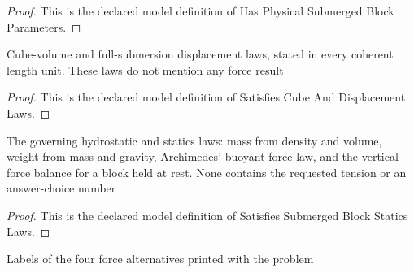 \begin{proof}
  This is the declared model definition of Has Physical Submerged Block Parameters.
\end{proof}
\begin{definition}
  \label{def:physics:phyx-mini-0722:phyxminiproblems-problemphyxmini0722-satisfiescubeanddisplacementlaws}
  Cube-volume and full-submersion displacement laws, stated in every coherent length unit. These laws do not mention any force result
\end{definition}
\begin{proof}
  This is the declared model definition of Satisfies Cube And Displacement Laws.
\end{proof}
\begin{definition}
  \label{def:physics:phyx-mini-0722:phyxminiproblems-problemphyxmini0722-satisfiessubmergedblockstaticslaws}
  The governing hydrostatic and statics laws: mass from density and volume, weight from mass and gravity, Archimedes' buoyant-force law, and the vertical force balance for a block held at rest. None contains the requested tension or an answer-choice number
\end{definition}
\begin{proof}
  This is the declared model definition of Satisfies Submerged Block Statics Laws.
\end{proof}
\begin{definition}
  \label{def:physics:phyx-mini-0722:phyxminiproblems-problemphyxmini0722-answerchoice}
  Labels of the four force alternatives printed with the problem
\end{definition}
